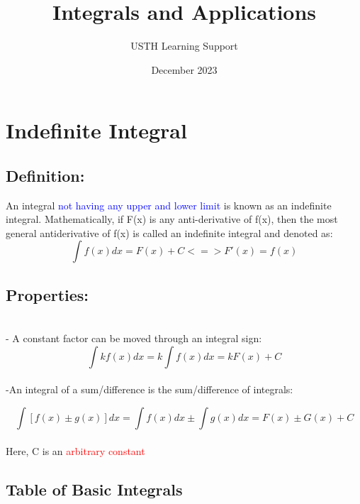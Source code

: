 \documentclass{article}
\title{Integrals and Applications}
\author{USTH Learning Support}
\date{December 2023}
\begin{document}
\maketitle
\tableofcontents

\pagebreak
\section{Indefinite Integral}

\subsection{Definition:}
An integral \textcolor{blue}{not having any upper and lower limit} is known as an indefinite integral. Mathematically, if F(x) is any anti-derivative of f(x), then the most general antiderivative of f(x) is called an indefinite integral and denoted as:
$$ \int f(x)dx = F(x) + C <=> F'(x) = f(x) $$
\subsection{Properties:}
\\

- A constant factor can be moved through an integral sign:
$$ \int kf(x)dx = k\int f(x) dx = kF(x) + C $$
\\
-An integral of a sum/difference is the sum/difference of integrals:

$$ \int [f(x) \pm g(x)]dx = \int f(x) dx \pm \int g(x) dx = F(x) \pm G(x) + C$$
\\
Here, C is an \textcolor{red}{arbitrary constant}


\begin{center}
\section*{Table of Basic Integrals}

\end{center}
\end{document}
